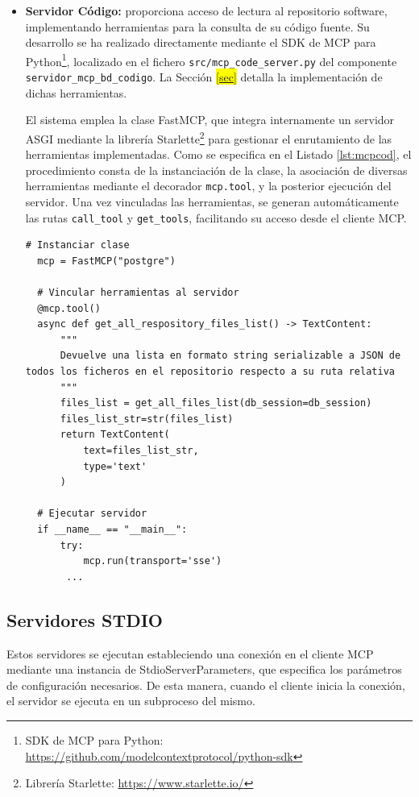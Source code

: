 \begin{itemize}
\item\textbf{Servidor Código: }proporciona acceso de lectura al repositorio software, implementando herramientas para la consulta de su código fuente. Su desarrollo se ha realizado directamente mediante el SDK de MCP para Python\footnote{SDK de MCP para Python: \url{https://github.com/modelcontextprotocol/python-sdk}}, localizado en el fichero \texttt{src/mcp\_code\_server.py} del componente \texttt{servidor\_mcp\_bd\_codigo}. La Sección \colorbox{yellow}{\ref{sec}} detalla la implementación de dichas herramientas.

  El sistema emplea la clase FastMCP, que integra internamente un servidor ASGI mediante la librería Starlette\footnote{Librería Starlette: \url{https://www.starlette.io/}} para gestionar el enrutamiento de las herramientas implementadas. Como se especifica en el Listado \ref{lst:mcpcod}, el procedimiento consta de la instanciación de la clase, la asociación de diversas herramientas mediante el decorador \texttt{mcp.tool}, y la posterior ejecución del servidor. Una vez vinculadas las herramientas, se generan automáticamente las rutas \texttt{call\_tool} y \texttt{get\_tools}, facilitando su acceso desde el cliente MCP.

\begin{lstlisting}[caption={\texttt{mcp\_code\_server.py: ejecución del servidor MCP con acceso al código fuente}},label={lst:mcpcod}]
  # Instanciar clase 
  mcp = FastMCP("postgre")

  # Vincular herramientas al servidor
  @mcp.tool()
  async def get_all_respository_files_list() -> TextContent:
      """
      Devuelve una lista en formato string serializable a JSON de todos los ficheros en el repositorio respecto a su ruta relativa
      """
      files_list = get_all_files_list(db_session=db_session)
      files_list_str=str(files_list)
      return TextContent(
          text=files_list_str,
          type='text'
      )

  # Ejecutar servidor
  if __name__ == "__main__":
      try:
          mcp.run(transport='sse')
       ...

\end{lstlisting}


\end{itemize}

\subsection{Servidores STDIO}
\label{sec:stdio}
Estos servidores se ejecutan estableciendo una conexión en el cliente MCP mediante una instancia de StdioServerParameters, que especifica los parámetros de configuración necesarios. De esta manera, cuando el cliente inicia la conexión, el servidor se ejecuta en un subproceso del mismo.

